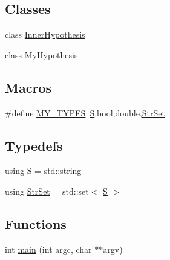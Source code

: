 \subsection*{Classes}
\begin{DoxyCompactItemize}
\item 
class \hyperlink{class_inner_hypothesis}{Inner\+Hypothesis}
\item 
class \hyperlink{class_my_hypothesis}{My\+Hypothesis}
\end{DoxyCompactItemize}
\subsection*{Macros}
\begin{DoxyCompactItemize}
\item 
\#define \hyperlink{_models_2_formal_language_theory-_complex_2_main_8cpp_a9982c6df11148a7d221b1839f38633a5}{M\+Y\+\_\+\+T\+Y\+P\+ES}~\hyperlink{_models_2_formal_language_theory-_complex_2_main_8cpp_a51c40915539205f0b5add30b0d68a4cb}{S},bool,double,\hyperlink{_models_2_formal_language_theory-_complex_2_main_8cpp_a809d982ed20fa378f251596c3b5ad6b7}{Str\+Set}
\end{DoxyCompactItemize}
\subsection*{Typedefs}
\begin{DoxyCompactItemize}
\item 
using \hyperlink{_models_2_formal_language_theory-_complex_2_main_8cpp_a51c40915539205f0b5add30b0d68a4cb}{S} = std\+::string
\item 
using \hyperlink{_models_2_formal_language_theory-_complex_2_main_8cpp_a809d982ed20fa378f251596c3b5ad6b7}{Str\+Set} = std\+::set$<$ \hyperlink{_models_2_formal_language_theory-_complex_2_main_8cpp_a51c40915539205f0b5add30b0d68a4cb}{S} $>$
\end{DoxyCompactItemize}
\subsection*{Functions}
\begin{DoxyCompactItemize}
\item 
int \hyperlink{_models_2_formal_language_theory-_complex_2_main_8cpp_a3c04138a5bfe5d72780bb7e82a18e627}{main} (int argc, char $\ast$$\ast$argv)
\end{DoxyCompactItemize}
